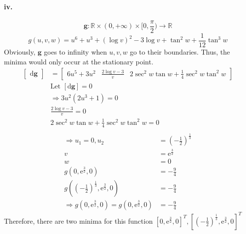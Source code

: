 \documentclass[11pt, a4paper]{article}
\begin{document}
\paragraph{iv.}
$$\bm{g}: \mathbb{R} \times (0, +\infty) \times [0, \frac{\pi}{2}) \to \mathbb{R}$$
$$g(u, v, w) = u^6 + u^3 + (\log v)^2 - 3\log v + \tan^2 w + \frac{1}{12}\tan^3 w$$
Obviously, $\bm{g}$ goes to infinity when $u, v, w$ go to their boundaries. Thus, the minima would only occur at the stationary point.
$$\begin{aligned}
    \begin{bmatrix}
        \mathrm{d}\bm{g}
    \end{bmatrix} &=
    \begin{bmatrix}
        6u^5 + 3u^2 & \frac{2\log v - 3}{v} & 2\sec^2 w\tan w + \frac{1}{4}\sec^2 w\tan^2 w
    \end{bmatrix} \\
    &\text{Let } [\mathrm{d}\bm{g}] = 0 \\
    &\Rightarrow 3u^2(2u^3 + 1) = 0 \\
    &\frac{2\log v - 3}{v} = 0 \\
    &2\sec^2 w\tan w + \frac{1}{4}\sec^2 w\tan^2 w = 0 \\
\end{aligned}$$
$$\begin{aligned}
    \Rightarrow u_1 = 0, u_2 &= (-\frac{1}{2})^{\frac{1}{3}} \\
    v &= \mathrm{e}^{\frac{3}{2}} \\
    w &= 0 \\
    g(0, \mathrm{e}^{\frac{3}{2}}, 0) &= -\frac{9}{4} \\
    g((-\frac{1}{2})^{\frac{1}{3}}, \mathrm{e}^{\frac{3}{2}}, 0) &= -\frac{9}{4} \\
    \Rightarrow g(0, \mathrm{e}^{\frac{3}{2}}, 0) = g(0, \mathrm{e}^{\frac{3}{2}}, 0) &= -\frac{9}{4}
\end{aligned}$$
Therefore, there are two minima for this function $[0, \mathrm{e}^{\frac{3}{2}}, 0]^T, [(-\frac{1}{2})^{\frac{1}{3}}, \mathrm{e}^{\frac{3}{2}}, 0]^T$
\end{document}

